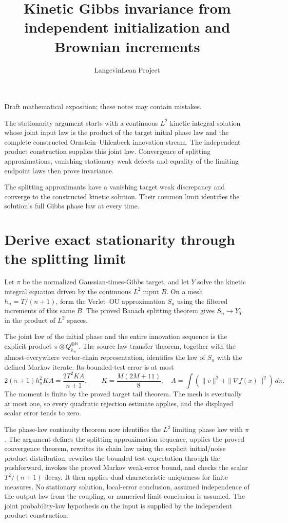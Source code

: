 \documentclass[11pt,a4paper]{article}
\title{\texorpdfstring{Kinetic Gibbs invariance from independent initialization and Brownian increments}{Kinetic Gibbs invariance from independent initialization and Brownian increments}}
\author{LangevinLean Project}
\date{}
\begin{document}
\maketitle
Draft mathematical exposition; these notes may contain mistakes.


The stationarity argument starts with a continuous \(L^{2}\) kinetic integral solution whose joint input law is the product of the target initial phase law and the complete constructed Ornstein–Uhlenbeck innovation stream. The independent product construction supplies this joint law. Convergence of splitting approximations, vanishing stationary weak defects and equality of the limiting endpoint laws then prove invariance.



The splitting approximants have a vanishing target weak discrepancy and converge to the constructed kinetic solution. Their common limit identifies the solution’s full Gibbs phase law at every time.


\section{\texorpdfstring{Derive exact stationarity through the splitting limit}{Derive exact stationarity through the splitting limit}}


Let \(\pi\) be the normalized Gaussian-times-Gibbs target, and let \(Y\) solve the kinetic integral equation driven by the continuous \(L^{2}\) input \(B\). On a mesh \(h_n=T/(n+1)\), form the Verlet–OU approximation \(S_n\) using the filtered increments of this same \(B\). The proved Banach splitting theorem gives \(S_n\to Y_T\) in the product of \(L^{2}\) spaces.



The joint law of the initial phase and the entire innovation sequence is the explicit product \(\pi\otimes Q_{h_n}^{\otimes\mathbb N}\). The source-law transfer theorem, together with the almost-everywhere vector-chain representation, identifies the law of \(S_n\) with the defined Markov iterate. Its bounded-test error is at most \[2(n+1)h_n^2 K A=\frac{2T^2KA}{n+1},\qquad K=\frac{M(2M+11)}8,\quad A=\int(\|v\|^2+\|\nabla f(x)\|^2)\,d\pi.\] The moment is finite by the proved target tail theorem. The mesh is eventually at most one, so every quadratic rejection estimate applies, and the displayed scalar error tends to zero.



The phase-law continuity theorem now identifies the \(L^{2}\) limiting phase law with \(\pi\). The argument defines the splitting approximation sequence, applies the proved convergence theorem, rewrites its chain law using the explicit initial/\allowbreak{}noise product distribution, rewrites the bounded test expectation through the pushforward, invokes the proved Markov weak-error bound, and checks the scalar \(T^2/(n+1)\) decay. It then applies dual-characteristic uniqueness for finite measures. No stationary solution, local-error conclusion, assumed independence of the output law from the coupling, or numerical-limit conclusion is assumed. The joint probability-law hypothesis on the input is supplied by the independent product construction.
\end{document}
